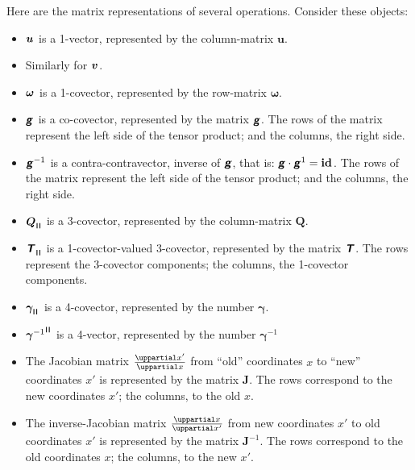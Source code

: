 \documentclass[\ifafour a4paper,12pt,\else a5paper,10pt,\fi%
onecolumn,oneside,article,%
british%
]{memoir}
\makeatletter
\theoremstyle{remark}
\theoremstyle{innote}
\newcommand*{\mathte}[1]{\textbf{\textit{\textsf{#1}}}}
\newcommand*{\de}{\uppartial}%
\renewcommand*{\|}[1][]{\nonscript\:#1\vert\nonscript\:\mathopen{}}
\newcommand*{\id}{\mathbf{id}}%
\renewcommand*{\i}{\indices}
\newcommand*{\q}{}%
\DeclareRobustCommand*{\q}{%
  \mathord{\mathpalette\bigcdot@{}}%
}
\newcommand*{\bigcdot@scalefactor}{0.7}
\newcommand*{\bigcdot@widthfactor}{1.5}
\newcommand*{\bigcdot@}[2]{%
  \sbox0{$#1\vcenter{}$}%
  \sbox2{$#1\cdot\m@th$}%
  \hbox to \bigcdot@widthfactor\wd2{%
    \hfil
    \raise\ht0\hbox{%
      \scalebox{\bigcdot@scalefactor}{%
        \lower\ht0\hbox{$#1\bullet\m@th$}%
      }%
    }%
    \hfil
  }%
}
\newcommand*{\rul}{{\mkern2mu\rule[-0.1ex]{0.75pt}{1.1ex}\mkern2mu}}
\DeclarePairedDelimiter\mul{\rul}{\rul}%
\newcommand*{\yg}{\mathte{g}}
\newcommand*{\ve}{\bm{\gamma}}
\newcommand*{\vi}{\bm{\gamma}^{-1}}
\newcommand*{\yQ}{\bm{Q}}
\newcommand*{\yT}{\mathte{T}}
\newcommand*{\yu}{\bm{u}}
\newcommand*{\yv}{\bm{v}}
\newcommand*{\yo}{\bm{\omega}}
\newcommand*{\yJ}{\bm{J}}
\makeatother
\begin{document}
Here are the matrix representations of several operations. Consider these objects:
\begin{itemize}
\item $\yu\i{^{\q}}$ is a 1-vector, represented by the column-matrix $\yu$.
\item Similarly for $\yv\i{^{\q}}$.
\item $\yo\i{_{\q}}$ is a 1-covector, represented by the row-matrix $\yo$.
\item $\yg\i{_{\q\q}}$ is a co-covector, represented by the matrix $\yg$. The rows of the matrix represent the left side of the tensor product; and the columns, the right side.
\item ${\yg^{-1}}\i{^{\q\q}}$ is a contra-contravector, inverse of $\yg$, that is: $\yg\cdot\yg^{1} = \id\i{_{\q}^{\q}}$. The rows of the matrix represent the left side of the tensor product; and the columns, the right side.

\item $\yQ\i{_{\mul{\q\q\q}}}$ is a 3-covector, represented by the column-matrix $\yQ$.

\item $\yT\i{_{\mul{\q\q\q}\q}}$ is a 1-covector-valued 3-covector, represented by the matrix $\yT$. The rows represent the 3-covector components; the columns, the 1-covector components.
\item $\ve\i{_{\mul{\q\q\q\q}}}$ is a 4-covector, represented by the number $\ve$.
\item ${\vi}\i{^{\mul{\q\q\q\q}}}$ is a 4-vector, represented by the number $\vi$
\item The Jacobian matrix $\frac{\de x'}{\de x}$ from \enquote{old} coordinates $x$ to \enquote{new} coordinates $x'$ is represented by the matrix $\yJ$. The rows correspond to the new coordinates $x'$; the columns, to the old $x$.

\item The inverse-Jacobian matrix $\frac{\de x}{\de x'}$ from new coordinates $x'$ to old coordinates $x'$ is represented by the matrix $\yJ^{-1}$. The rows correspond to the old coordinates $x$; the columns, to the new $x'$.
\end{itemize}
\end{document}

